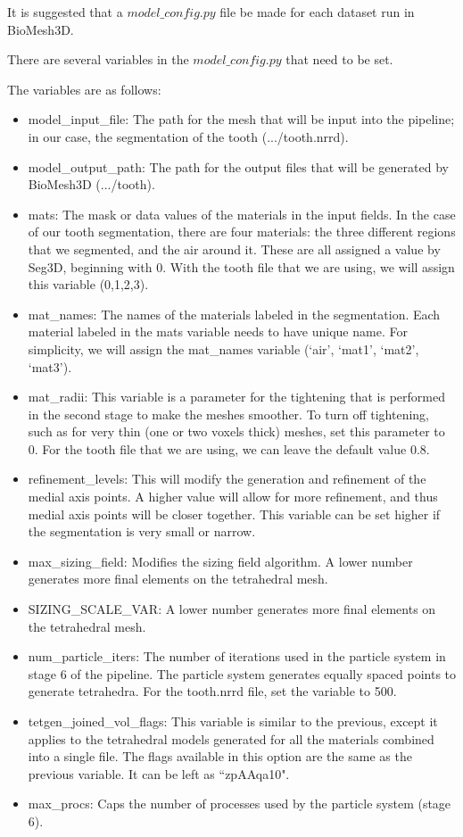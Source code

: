 \documentclass[fleqn,12pt,openany]{book}
\begin{document}
It is suggested that a $model\_config.py$ file be made for each dataset run 
in BioMesh3D.

There are several variables in the $model\_config.py$ that need to be set.  

The variables are as follows:

\begin{itemize}
	\item model\_input\_file: The path for the mesh that will be input into the pipeline; in our case, the segmentation of the tooth (.../tooth.nrrd).
	\item model\_output\_path: The path for the output files that will be generated by BioMesh3D (.../tooth).
	\item mats: The mask or data values of the materials in the input fields. In the case of our tooth segmentation, there are four materials:  the three different regions that we segmented, and the air around it. These are all assigned a value by Seg3D, beginning with 0. With the tooth file that we are using, we will assign this variable (0,1,2,3).
	\item mat\_names: The names of the materials labeled in the segmentation. Each material labeled in the mats variable needs to have unique name. For simplicity, we will assign the mat\_names variable (`air', `mat1', `mat2', `mat3').
	\item mat\_radii: This variable is a parameter for the tightening that is performed in the second stage to make the meshes smoother. To turn off tightening, such as for very thin (one or two voxels thick) meshes, set this parameter to 0. For the tooth file that we are using, we can leave the default value 0.8.  
	\item refinement\_levels: This will modify the generation and refinement of the medial axis points. A higher value will allow for more refinement, and thus medial axis points will be closer together. This variable can be set higher if the segmentation is very small or narrow.
	\item max\_sizing\_field: Modifies the sizing field algorithm. A lower number generates more final elements on the tetrahedral mesh.
	\item SIZING\_SCALE\_VAR: A lower number generates more final elements on the tetrahedral mesh.
	\item num\_particle\_iters: The number of iterations used in the particle system in stage 6 of the pipeline. The particle system generates equally spaced points to generate tetrahedra. For the tooth.nrrd file, set the variable to 500.
	\item tetgen\_joined\_vol\_flags: This variable is similar to the previous, except it applies to the tetrahedral models generated for all the materials combined into a single file. The flags available in this option are the same as the previous variable. It can be left as ``zpAAqa10".
	\item max\_procs: Caps the number of processes used by the particle system (stage 6).
\end{itemize}
\end{document}
